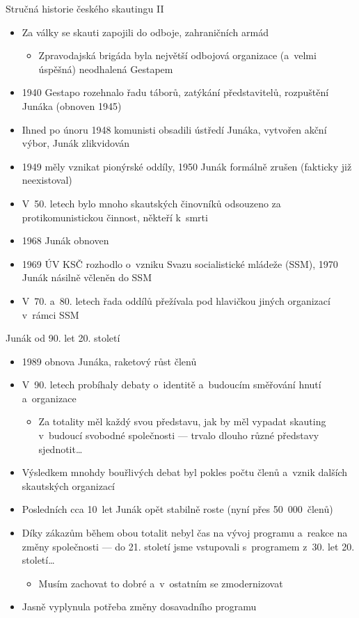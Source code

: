 \documentclass[compress, ucs, xelatex, xcolor=dvipsnames, print,
  hyperref={
    bookmarks=true,
    unicode=true,
    colorlinks=true,
    plainpages=false,
    pdfkeywords={Skaut, Junak, Skauting, Vychovna metoda},
    linkcolor=Black,
    anchorcolor=Black,
    citecolor=OliveGreen,
    filecolor=OliveGreen,
    menucolor=Black,
    urlcolor=OliveGreen,
    pdftex}
  ]{beamer}
\begin{document}
\begin{frame}{Stručná historie českého skautingu II}
  \begin{itemize}
    \item Za války se skauti zapojili do odboje, zahraničních armád
    \begin{itemize}
      \item Zpravodajská brigáda byla největší odbojová organizace (a~velmi úspěšná) neodhalená Gestapem
    \end{itemize}
    \item 1940 Gestapo rozehnalo řadu táborů, zatýkání představitelů, rozpuštění Junáka (obnoven 1945)
    \item Ihned po únoru 1948 komunisti obsadili ústředí Junáka, vytvořen akční výbor, Junák zlikvidován
    \item 1949 měly vznikat pionýrské oddíly, 1950 Junák formálně zrušen (fakticky již neexistoval)
    \item V~50. letech bylo mnoho skautských činovníků odsouzeno za protikomunistickou činnost, někteří k~smrti
    \item 1968 Junák obnoven
    \item 1969 ÚV KSČ rozhodlo o~vzniku Svazu socialistické mládeže (SSM), 1970 Junák násilně včleněn do SSM
    \item V~70. a~80. letech řada oddílů přežívala pod hlavičkou jiných organizací v~rámci SSM
  \end{itemize}
\end{frame}

\begin{frame}{Junák od 90. let 20. století}
  \begin{itemize}
    \item 1989 obnova Junáka, raketový růst členů
    \item V~90. letech probíhaly debaty o~identitě a~budoucím směřování hnutí a~organizace
    \begin{itemize}
      \item Za totality měl každý svou představu, jak by měl vypadat skauting v~budoucí svobodné společnosti --- trvalo dlouho různé představy sjednotit\ldots
    \end{itemize}
    \item Výsledkem mnohdy bouřlivých debat byl pokles počtu členů a~vznik dalších skautských organizací
    \item Posledních cca 10~let Junák opět stabilně roste (nyní přes 50~000~členů)
    \item Díky zákazům během obou totalit nebyl čas na vývoj programu a~reakce na změny společnosti --- do 21. století jsme vstupovali s~programem z~30. let 20. století\ldots
    \begin{itemize}
      \item Musím zachovat to dobré a~v~ostatním se zmodernizovat
    \end{itemize}
    \item Jasně vyplynula potřeba změny dosavadního programu
  \end{itemize}
\end{frame}
\end{document}
